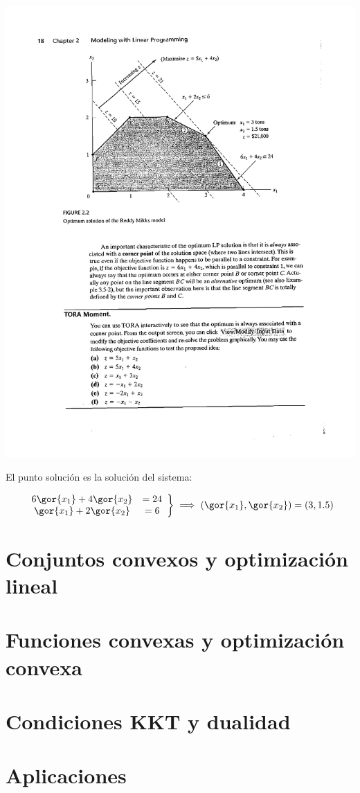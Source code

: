 \documentclass[palatino,nochap]{apuntes}
\begin{document}
\begin{example}
\begin{center}
\includegraphics[scale=0.8]{tex/berrendero/tema1/_GraficoEjemplo2}
\end{center}


El punto solución es la solución del sistema:

\[
\left.\begin{array}{cc} 6\gor{x_1} + 4\gor{x_2} &= 24\\ \gor{x_1} + 2\gor{x_2} &= 6\end{array}\right\} \implies (\gor{x_1},\gor{x_2}) = (3,1.5)
\]
\end{example}


\chapter{Conjuntos convexos y optimización lineal}



\chapter{Funciones convexas y optimización convexa}


\chapter{Condiciones KKT y dualidad}


\chapter{Aplicaciones}


\appendix

\printindex
\end{document}
